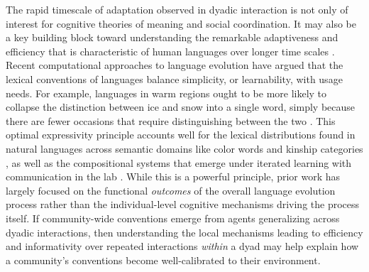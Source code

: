 \documentclass[11pt]{article}
\begin{document}
The rapid timescale of adaptation observed in dyadic interaction is not only of interest for cognitive theories of meaning and social coordination. 
It may also be a key building block toward understanding the remarkable adaptiveness and efficiency that is characteristic of human languages over longer time scales \cite{RegierKempKay15_WordMeaningsEfficientCommunication,KirbyTamarizCornishSmith15_CompressionCommunication,gibson2019efficiency}.
Recent computational approaches to language evolution have argued that the lexical conventions of languages balance simplicity, or learnability, with usage needs. 
For example, languages in warm regions ought to be more likely to collapse the distinction between ice and snow into a single word, simply because there are fewer occasions that require distinguishing between the two . 
This optimal expressivity principle accounts well for the lexical distributions found in natural languages across semantic domains like color words and kinship categories \cite{RegierKempKay15_WordMeaningsEfficientCommunication,GibsonEtAl17_ColorNamingUse}, as well as the compositional systems that emerge under iterated learning with communication in the lab . 
While this is a powerful principle, prior work has largely focused on the functional \emph{outcomes} of the overall language evolution process rather than the individual-level cognitive mechanisms driving the process itself.
If community-wide conventions emerge from agents generalizing across dyadic interactions, then understanding the local mechanisms leading to efficiency and informativity over repeated interactions \emph{within} a dyad may help explain how a community’s conventions become well-calibrated to their environment. 

\end{document}
